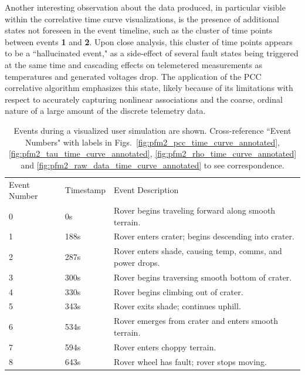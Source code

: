Another interesting observation about the data produced, in particular visible within the correlative time curve visualizations, is the presence of additional states not foreseen in the event timeline, such as the cluster of time points between events \textbf{1} and \textbf{2}. Upon close analysis, this cluster of time points appears to be a ``hallucinated event," as a side-effect of several fault states being triggered at the same time and cascading effects on telemetered measurements as temperatures and generated voltages drop. The application of the PCC correlative algorithm emphasizes this state, likely because of its limitations with respect to accurately capturing nonlinear associations and the coarse, ordinal nature of a large amount of the discrete telemetry data.

\begin{table}[]
\centering
\begin{tabular}{lll}
Event Number & Timestamp & Event Description \\
0 & 0s & Rover begins traveling forward along smooth terrain. \\
1 & 188s & Rover enters crater; begins descending into crater. \\
2 & 287s & Rover enters shade, causing temp, comms, and power drops. \\
3 & 300s & Rover begins traversing smooth bottom of crater. \\
4 & 330s & Rover begins climbing out of crater. \\
5 & 343s & Rover exits shade; continues uphill. \\
6 & 534s & Rover emerges from crater and enters smooth terrain. \\
7 & 594s & Rover enters choppy terrain. \\
8 & 643s & Rover wheel has fault; rover stops moving.
\end{tabular}
\caption{Events during a visualized user simulation are shown. Cross-reference ``Event Numbers" with labels in Figs.~\ref{fig:pfm2_pcc_time_curve_annotated}, \ref{fig:pfm2_tau_time_curve_annotated}, \ref{fig:pfm2_rho_time_curve_annotated} and \ref{fig:pfm2_raw_data_time_curve_annotated} to see correspondence.}
\label{tbl:events}
\end{table}

